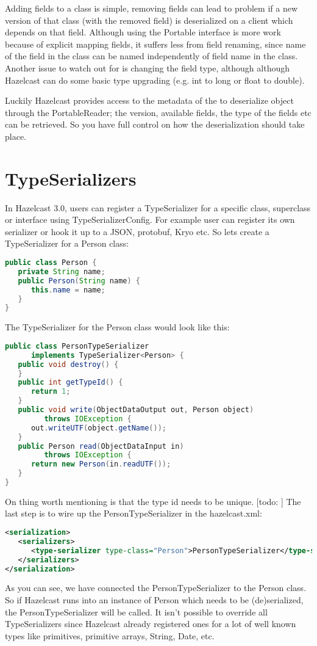 Adding fields to a class is simple, removing fields can lead to problem if a new version of that class (with the removed field) is deserialized on a client which depends on that field. Although using the Portable interface is more work because of explicit mapping fields, it suffers less from field renaming, since name of the field in the class can be named independently of field name in the class. Another issue to watch out for is changing the field type, although although Hazelcast can do some basic type upgrading (e.g. int to long or float to double). 

Luckily Hazelcast provides access to the metadata of the to deserialize object through the PortableReader; the  version, available fields, the type of the fields etc can be retrieved. So you have full control on how the deserialization should take place. 

\section{TypeSerializers}
In Hazelcast 3.0, users can register a TypeSerializer for a specific class, superclass or interface using TypeSerializerConfig. For example user can register its own serializer or hook it up to a JSON, protobuf, Kryo etc. So lets create a TypeSerializer for a Person class:
\begin{lstlisting}[language=java]
public class Person {
   private String name;
   public Person(String name) {
      this.name = name;
   }
}
\end{lstlisting}
The TypeSerializer for the Person class would look like this:
\begin{lstlisting}[language=java]
public class PersonTypeSerializer 
      implements TypeSerializer<Person> {
   public void destroy() {	  
   }
   public int getTypeId() {
      return 1;
   }
   public void write(ObjectDataOutput out, Person object) 
         throws IOException {
      out.writeUTF(object.getName());
   }
   public Person read(ObjectDataInput in) 
         throws IOException {
      return new Person(in.readUTF());
   }
}
\end{lstlisting}
On thing worth mentioning is that the type id needs to be unique. [todo: ] The last step is to wire up the PersonTypeSerializer in the hazelcast.xml:
\begin{lstlisting}[language=xml]
<serialization>
   <serializers>
      <type-serializer type-class="Person">PersonTypeSerializer</type-serializer>
   </serializers>
</serialization>
\end{lstlisting}
As you can see, we have connected the PersonTypeSerializer to the Person class. So if Hazelcast runs into an instance of Person which needs to be (de)serialized, the PersonTypeSerializer will be called. It isn't possible to override all TypeSerializers since Hazelcast already registered ones for a lot of well known types like primitives, primitive arrays, String, Date, etc.

